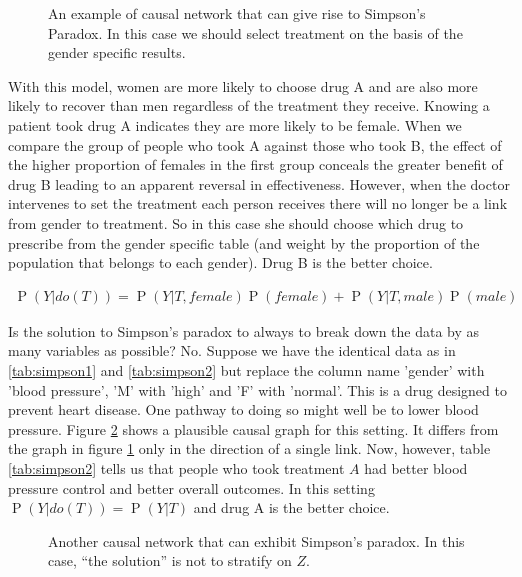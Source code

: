 \documentclass[11pt,a4paper,oneside]{book}
\newcommand{\eqn}[1]{\begin{align}#1\end{align}}
\renewcommand{\P}[1]{\operatorname{P}\left(#1\right)}
\newcommand{\quotes}[1]{``#1''}
\theoremstyle{plain}
\theoremstyle{definition}
\begin{document}
\begin{figure}[h]
\centering
{}
\caption{An example of causal network that can give rise to Simpson's Paradox. In this case we should select treatment on the basis of the gender specific results.}
\label{fig:simpsons_paradox}
\end{figure}

With this model, women are more likely to choose drug A and are also more likely to recover than men regardless of the treatment they receive. Knowing a patient took drug A indicates they are more likely to be female. When we compare the group of people who took A against those who took B, the effect of the higher proportion of females in the first group conceals the greater benefit of drug B leading to an apparent reversal in effectiveness. However, when the doctor intervenes to set the treatment each person receives there will no longer be a link from gender to treatment. So in this case she should choose which drug to prescribe from the gender specific table (and weight by the proportion of the population that belongs to each gender). Drug B is the better choice.

\eqn{
\P{Y|do(T)} = \P{Y|T,female}\P{female}+ \P{Y|T,male}\P{male}
}

Is the solution to Simpson's paradox to always to break down the data by as many variables as possible? No. Suppose we have the identical data as in \ref{tab:simpson1} and \ref{tab:simpson2} but replace the column name 'gender' with 'blood pressure', 'M' with 'high' and 'F' with 'normal'. This is a drug designed to prevent heart disease. One pathway to doing so might well be to lower blood pressure. Figure \ref{fig:simpsons_paradox2} shows a plausible causal graph for this setting. It differs from the graph in figure \ref{fig:simpsons_paradox} only in the direction of a single link. Now, however, table \ref{tab:simpson2} tells us that people who took treatment $A$ had better blood pressure control and better overall outcomes. In this setting $\P{Y|do(T)} = \P{Y|T}$ and drug A is the better choice. 

\begin{figure}[h]
\centering
{}
\caption{Another causal network that can exhibit Simpson's paradox. In this case, \quotes{the solution} is not to stratify on $Z$.}
\label{fig:simpsons_paradox2}
\end{figure}
\end{document}
